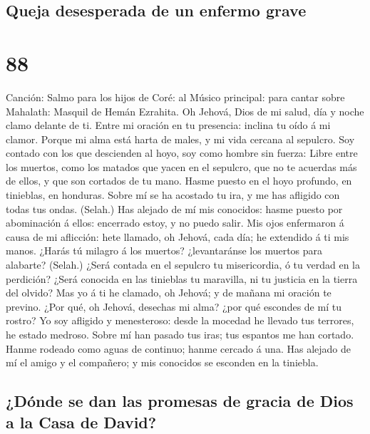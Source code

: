 \hypertarget{queja-desesperada-de-un-enfermo-grave}{%
\subsection{Queja desesperada de un enfermo
grave}\label{queja-desesperada-de-un-enfermo-grave}}

\hypertarget{section-87}{%
\section{88}\label{section-87}}

 Canción: Salmo para los hijos de Coré: al Músico
principal: para cantar sobre Mahalath: Masquil de Hemán Ezrahita. Oh
Jehová, Dios de mi salud, día y noche clamo delante de ti.
 Entre mi oración en tu presencia: inclina tu oído á mi
clamor.  Porque mi alma está harta de males, y mi vida
cercana al sepulcro.  Soy contado con los que descienden
al hoyo, soy como hombre sin fuerza:  Libre entre los
muertos, como los matados que yacen en el sepulcro, que no te acuerdas
más de ellos, y que son cortados de tu mano.  Hasme puesto
en el hoyo profundo, en tinieblas, en honduras.  Sobre mí
se ha acostado tu ira, y me has afligido con todas tus ondas. (Selah.)
 Has alejado de mí mis conocidos: hasme puesto por
abominación á ellos: encerrado estoy, y no puedo salir. 
Mis ojos enfermaron á causa de mi aflicción: hete llamado, oh Jehová,
cada día; he extendido á ti mis manos.  ¿Harás tú milagro
á los muertos? ¿levantaránse los muertos para alabarte? (Selah.)
 ¿Será contada en el sepulcro tu misericordia, ó tu
verdad en la perdición?  ¿Será conocida en las tinieblas
tu maravilla, ni tu justicia en la tierra del olvido? 
Mas yo á ti he clamado, oh Jehová; y de mañana mi oración te previno.
 ¿Por qué, oh Jehová, desechas mi alma? ¿por qué escondes
de mí tu rostro?  Yo soy afligido y menesteroso: desde la
mocedad he llevado tus terrores, he estado medroso. 
Sobre mí han pasado tus iras; tus espantos me han cortado.
 Hanme rodeado como aguas de continuo; hanme cercado á
una.  Has alejado de mí el amigo y el compañero; y mis
conocidos se esconden en la tiniebla.

\hypertarget{duxf3nde-se-dan-las-promesas-de-gracia-de-dios-a-la-casa-de-david}{%
\subsection{¿Dónde se dan las promesas de gracia de Dios a la Casa de
David?}\label{duxf3nde-se-dan-las-promesas-de-gracia-de-dios-a-la-casa-de-david}}

